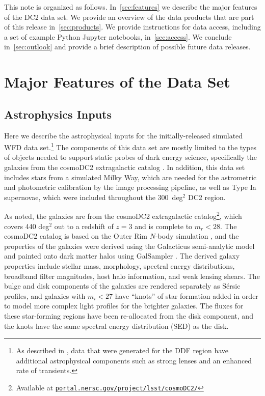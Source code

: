 \documentclass[modern]{descnote}
\newcommand*{\https}[1]{\href{https://#1}{\nolinkurl{#1}}}
\begin{document}
This note is organized as follows. In~\autoref{sec:features} we describe the major features of the DC2 data set. We provide an overview of the data products that are part of this release in~\autoref{sec:products}. We provide instructions for data access, including a set of example Python Jupyter notebooks, in~\autoref{sec:access}. We conclude in~\autoref{sec:outlook} and provide a brief description of possible future data releases. 

\section{Major Features of the Data Set}
\label{sec:features}

\subsection{Astrophysics Inputs}

Here we describe the astrophysical inputs for the initially-released simulated WFD data set.\footnote{As described in \cite{2020arXiv201005926L}, data that were generated for the DDF region have additional astrophysical components such as strong lenses and an enhanced rate of transients.}  The components of this data set are mostly limited to the types of objects needed to support static probes of dark energy science, specifically the galaxies from the cosmoDC2 extragalactic catalog \citep{korytov}.  In addition, this data set includes stars from a simulated Milky Way, which are needed for the astrometric and photometric calibration by the image processing pipeline, as well as Type Ia supernovae, which were included throughout the 300~deg$^2$ DC2 region.

As noted, the galaxies are from the cosmoDC2 extragalactic catalog\footnote{Available at \https{portal.nersc.gov/project/lsst/cosmoDC2/}}, which covers 440 deg$^2$ out to a redshift of $z = 3$ and is complete to $m_r <28$.  The cosmoDC2 catalog is based on the Outer Rim $N$-body simulation \citep{2019ApJS..245...16H}, and the properties of the galaxies were derived using the Galacticus semi-analytic model \citep{benson_2010b} and painted onto dark matter halos using GalSampler \citep{2020MNRAS.495.5040H}.  The derived galaxy properties include stellar mass, morphology, spectral energy distributions, broadband filter magnitudes, host halo information, and weak lensing shears.   The bulge and disk components of the galaxies are rendered separately as S\'ersic profiles, and galaxies with $m_i < 27$ have ``knots'' of star formation added in order to model more complex light profiles for the brighter galaxies. The fluxes for these star-forming regions have been re-allocated from the disk component, and the knots have the same spectral energy distribution (SED) as the disk.
\end{document}
